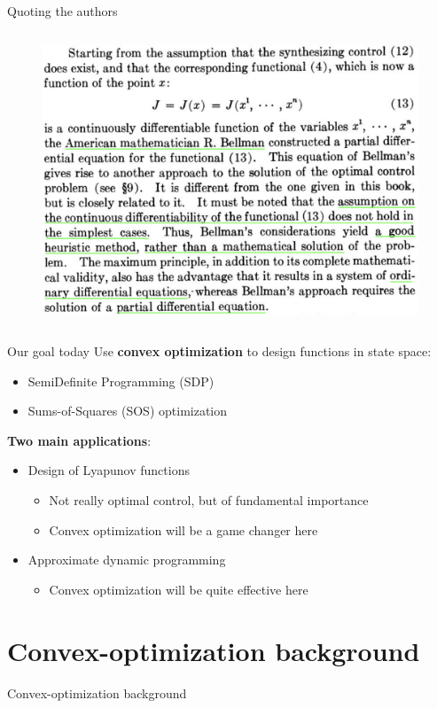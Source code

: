 \documentclass[aspectratio=169]{beamer}
\begin{document}
\begin{frame}{Quoting the authors}
\begin{columns}
\begin{figure}[h]
\includegraphics[width=.9\columnwidth]{figures/pontryagin_quote.png}
\end{figure}
\end{columns}
\end{frame}

\begin{frame}{Our goal today}
Use \textbf{convex optimization} to design functions in state space:
\begin{itemize}
\item
SemiDefinite Programming (SDP)
\item
Sums-of-Squares (SOS) optimization
\end{itemize}
\pause
\textbf{Two main applications}:
\begin{itemize}
\item
Design of Lyapunov functions
\begin{itemize}
\item
Not really optimal control, but of fundamental importance
\item
Convex optimization will be a game changer here
\end{itemize}
\item
Approximate dynamic programming
\begin{itemize}
\item
Convex optimization will be quite effective here
\end{itemize}
\end{itemize}
\end{frame}

\section{Convex-optimization background}
\begin{frame}
\huge
\centering
{\color{darkred} Convex-optimization background}
\end{frame}
\end{document}
